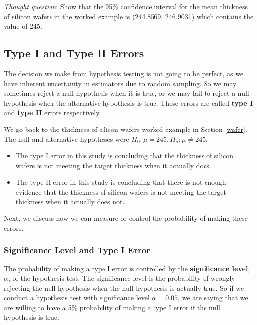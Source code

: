 \documentclass[
]{book}
\begin{document}
\emph{Thought question}: Show that the 95\% confidence interval for the mean thickness of silicon wafers in the worked example is (244.8569, 246.9031) which contains the value of 245.

\hypertarget{type-i-and-type-ii-errors}{%
\subsection{Type I and Type II Errors}\label{type-i-and-type-ii-errors}}

The decision we make from hypothesis testing is not going to be perfect, as we have inherent uncertainty in estimators due to random sampling. So we may sometimes reject a null hypothesis when it is true, or we may fail to reject a null hypothesis when the alternative hypothesis is true. These errors are called \textbf{type I} and \textbf{type II} errors respectively.

We go back to the thickness of silicon wafers worked example in Section \ref{wafer}. The null and alternative hypotheses were \(H_0: \mu = 245, H_a: \mu \neq 245\).

\begin{itemize}
\item
  The type I error in this study is concluding that the thickness of silicon wafers is not meeting the target thickness when it actually does.
\item
  The type II error in this study is concluding that there is not enough evidence that the thickness of silicon wafers is not meeting the target thickness when it actually does not.
\end{itemize}

Next, we discuss how we can measure or control the probability of making these errors.

\hypertarget{significance-level-and-type-i-error}{%
\subsubsection{Significance Level and Type I Error}\label{significance-level-and-type-i-error}}

The probability of making a type I error is controlled by the \textbf{significance level}, \(\alpha\), of the hypothesis test. The significance level is the probability of wrongly rejecting the null hypothesis when the null hypothesis is actually true. So if we conduct a hypothesis test with significance level \(\alpha = 0.05\), we are saying that we are willing to have a 5\% probability of making a type I error if the null hypothesis is true.
\end{document}
